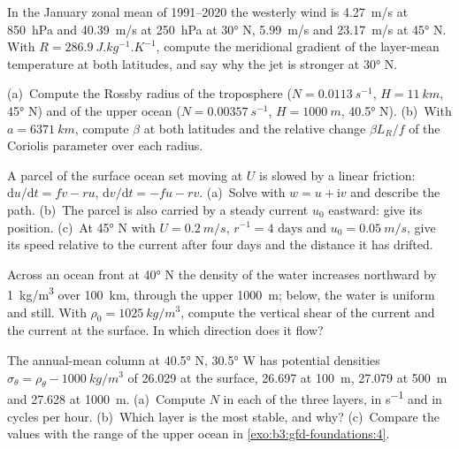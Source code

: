 \begin{exercise}[$\star\star$]\label{exo:b3:gfd-foundations:8}
In the January zonal mean of 1991--2020 the westerly wind is \qty{4.27}{m/s}
at \qty{850}{hPa} and \qty{40.39}{m/s} at \qty{250}{hPa} at \ang{30} N,
\qty{5.99}{m/s} and \qty{23.17}{m/s} at \ang{45} N. With $R =
\qty{286.9}{J.kg^{-1}.K^{-1}}$, compute the meridional gradient of the
layer-mean temperature at both latitudes, and say why the jet is stronger
at \ang{30} N.
\end{exercise}

\begin{exercise}[$\star\star$]\label{exo:b3:gfd-foundations:9}
(a)~Compute the Rossby radius of the troposphere ($N =
\qty{0.0113}{s^{-1}}$, $H = \qty{11}{km}$, \ang{45} N) and of the upper
ocean ($N = \qty{0.00357}{s^{-1}}$, $H = \qty{1000}{m}$, \ang{40.5} N).
(b)~With $a = \qty{6371}{km}$, compute $\beta$ at both latitudes and the
relative change $\beta L_R/f$ of the Coriolis parameter over each radius.
\end{exercise}

\begin{exercise}[$\star\star\star$]\label{exo:b3:gfd-foundations:10}
A parcel of the surface ocean set moving at $U$ is slowed by a linear
friction: $\mathrm du/\mathrm dt = fv - ru$, $\mathrm dv/\mathrm dt = -fu -
rv$. (a)~Solve with $w = u + \mathrm iv$ and describe the path. (b)~The
parcel is also carried by a steady current $u_0$ eastward: give its
position. (c)~At \ang{45} N with $U = \qty{0.2}{m/s}$, $r^{-1} =
\num{4}\text{ days}$ and $u_0 = \qty{0.05}{m/s}$, give its speed relative to the
current after four days and the distance it has drifted.
\end{exercise}

\begin{exercise}[$\star\star\star$]\label{exo:b3:gfd-foundations:11}
Across an ocean front at \ang{40} N the density of the water increases
northward by \qty{1}{kg/m^3} over \qty{100}{km}, through the upper
\qty{1000}{m}; below, the water is uniform and still. With $\rho_0 =
\qty{1025}{kg/m^3}$, compute the vertical shear of the current and the
current at the surface. In which direction does it flow?
\end{exercise}

\begin{exercise}[$\star\star\star$]\label{exo:b3:gfd-foundations:12}
The annual-mean column at \ang{40.5} N, \ang{30.5} W has potential
densities $\sigma_\theta = \rho_\theta - \qty{1000}{kg/m^3}$ of 26.029 at
the surface, 26.697 at \qty{100}{m}, 27.079 at \qty{500}{m} and 27.628 at
\qty{1000}{m}. (a)~Compute $N$ in each of the three layers, in
\unit{s^{-1}} and in cycles per hour. (b)~Which layer is the most stable,
and why? (c)~Compare the values with the range of the upper ocean in
\cref{exo:b3:gfd-foundations:4}.
\end{exercise}

